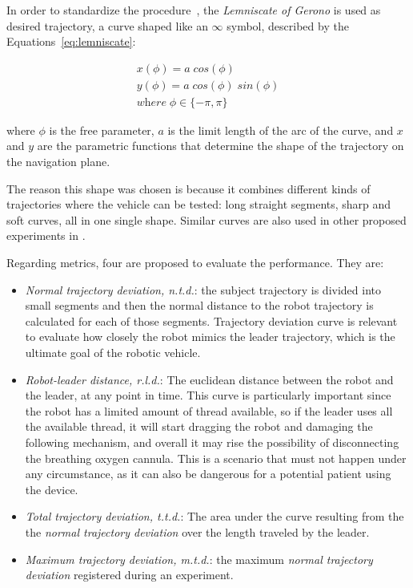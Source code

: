 \documentclass[journal]{IEEEtran}
\begin{document}
In order to standardize the procedure~\cite{Sprunk2016}, the \textit{Lemniscate of Gerono} is used as desired trajectory, a curve shaped like an $\infty$ symbol, described by the Equations~\ref{eq:lemniscate}:

\begin{equation}
\begin{array}{ll}  
 x( \phi ) = a \; cos( \phi )     \\
 y( \phi ) = a \; cos ( \phi )   \; sin ( \phi )    \\ 
 \textit{where}  \; \phi \in \lbrace -\pi , \pi  \rbrace
\end{array}
\label{eq:lemniscate}
\end{equation}

\noindent where $ \phi $ is the free parameter, $a$ is the limit length of the arc of the curve, and $x$ and $y$ are the parametric functions that determine the shape of the trajectory on the navigation plane.

The reason  this shape was chosen is because it combines different kinds of trajectories where the vehicle can be tested: long straight segments, sharp and soft curves, all in one single shape. Similar curves are also used in other proposed experiments in \cite{Neto2015,Endo2015}.  

Regarding metrics, four are proposed to evaluate the performance.  They are:

\begin{itemize}
    \item \textit{Normal trajectory deviation, n.t.d.}: the subject trajectory is divided into small segments and then the normal distance to the robot trajectory is calculated for each of those segments. Trajectory deviation curve is relevant to evaluate how closely the robot mimics the leader trajectory, which is the ultimate goal of the robotic vehicle. 
    \item \textit{Robot-leader distance, r.l.d.}: The euclidean distance between the robot and the leader, at any point in time. This curve is particularly important since the robot has a limited amount of thread available, so if the leader uses all the available thread, it will start dragging the robot and damaging the following mechanism, and overall it may rise the possibility of disconnecting the breathing oxygen cannula. This is a scenario that must not happen under any circumstance, as it can also be dangerous for a potential patient using the device. 
    \item \textit{Total trajectory deviation, t.t.d.}: The area under the curve resulting from the the \textit{normal trajectory deviation} over the length traveled by the leader.
    \item \textit{Maximum trajectory deviation, m.t.d.}: the maximum \textit{normal trajectory deviation} registered during an experiment.    
\end{itemize}{}
\end{document}
